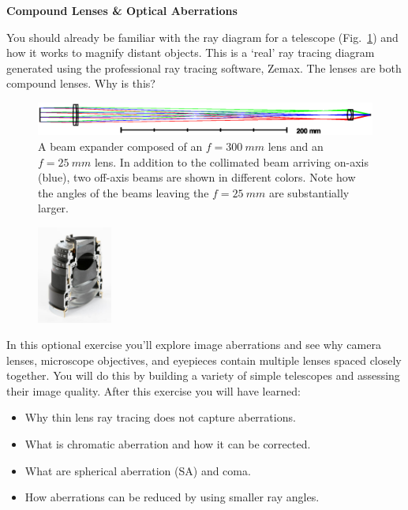 \documentclass[a4paper]{report}
\begin{document}
\setcounter{secnumdepth}{2}

\begin{center}
\textbf{\Large{Compound Lenses \& Optical Aberrations}}
\end{center}

You should already be familiar with the ray diagram for a telescope (Fig.~\ref{fig:telescope}) and how it works to magnify distant objects. 
This is a `real' ray tracing diagram generated using the professional ray tracing software, Zemax. 
The lenses are both compound lenses. 
Why is this?

\begin{figure}[h]
\center
\includegraphics[width=6in]{Telescope.eps}
\caption{A beam expander composed of an $f=300~mm$ lens and an $f=25~mm$ lens. 
In addition to the collimated beam arriving on-axis (blue), two off-axis beams are shown in different colors.
Note how the angles of the beams leaving the $f=25~mm$ are substantially larger.}
\label{fig:telescope}
\end{figure}

\begin{figure}
  \begin{center}
    \includegraphics[width=0.22\textwidth]{SLR_lens_cut_in_half.eps}

  \end{center}
  \vspace{-100pt} 
\end{figure}
In this optional exercise you'll explore image aberrations and see why camera lenses, microscope objectives, and eyepieces contain multiple lenses spaced closely together. 
You will do this by building a variety of simple telescopes and assessing their image quality.
After this exercise you will have learned:
\begin{itemize}
    \setlength\itemsep{0.15em}
    \item Why thin lens ray tracing does not capture aberrations.
    \item What is chromatic aberration and how it can be corrected.
    \item What are spherical aberration (SA) and coma.
    \item How aberrations can be reduced by using smaller ray angles.
\end{itemize}
\end{document}
